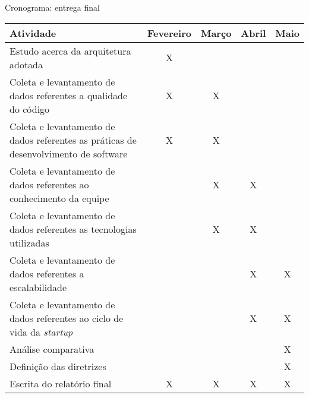 \begin{quadro}
    \caption{Cronograma: entrega final\label{quad:CronogramaTCC2}}
    \begin{tabular}{ | m{8cm} | c | c | c | c | }
    \hline
    \textbf{Atividade} &
        \textbf{Fevereiro} &
        \textbf{Março} &
        \textbf{Abril} &
        \textbf{Maio} \\ \hline
    Estudo acerca da arquitetura adotada &
        X &
        &
        &
        \\ \hline
    Coleta e levantamento de dados referentes a qualidade do código &
        X &
        X &
        &
        \\ \hline
    Coleta e levantamento de dados referentes as práticas de desenvolvimento de software &
        X &
        X &
        &
        \\ \hline
    Coleta e levantamento de dados referentes ao conhecimento da equipe &
        &
        X &
        X &
        \\ \hline
    Coleta e levantamento de dados referentes as tecnologias utilizadas &
        &
        X &
        X &
        \\ \hline
    Coleta e levantamento de dados referentes a escalabilidade &
        &
        &
        X &
        X
        \\ \hline
    Coleta e levantamento de dados referentes ao ciclo de vida da \textit{startup} &
        &
        &
        X &
        X
        \\ \hline
    Análise comparativa &
        &
        &
        &
        X
        \\ \hline
    Definição das diretrizes &
        &
        &
        &
        X
        \\ \hline
    Escrita do relatório final &
        X &
        X &
        X &
        X
        \\ \hline
    \end{tabular}
\end{quadro}
